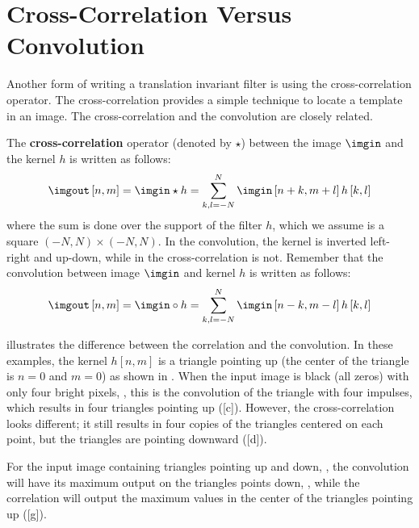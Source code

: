 \section{Cross-Correlation Versus Convolution}

Another form of writing a translation invariant filter is using the cross-correlation operator. The cross-correlation provides a simple technique to locate a template in an image.
The cross-correlation and the convolution are closely related.


The {\bf cross-correlation} operator (denoted by $\star$) between the image $\imgin$ and the kernel $h$ is written as follows:
\begin{equation}
	\imgout \left[n,m\right] = \imgin \star h =  \sum_{k,l=-N}^N \imgin \left[n+k,m+l \right] h \left[k,l \right]
\end{equation}
where the sum is done over the support of the filter $h$, which we assume is a square $(-N,N)\times(-N,N)$.
In the convolution, the kernel is inverted left-right and up-down, while in the cross-correlation is not. Remember that the convolution between image $\imgin$ and kernel $h$ is written as follows:
\begin{equation}
	\imgout \left[n,m\right] = \imgin \circ h = \sum_{k,l=-N}^N \imgin \left[n-k,m-l \right] h \left[k,l \right]
\end{equation}



\Fig{\ref{fig:corrvsconv}} illustrates the difference between the correlation and the convolution. In these examples, the kernel $h[n,m]$ is a triangle pointing up (the center of the triangle is $n=0$ and $m=0$) as shown in . When the input image is black (all zeros) with only four bright pixels, , this is the convolution of the triangle with four impulses, which results in four triangles pointing up (\fig{\ref{fig:corrvsconv}}[c]). However, the cross-correlation looks different; it still results in four copies of the triangles centered on each point, but the triangles are pointing downward (\fig{\ref{fig:corrvsconv}}[d]).

For the input image containing triangles pointing up and down, , the convolution will have its maximum output on the triangles points down, , while the correlation will output the maximum values in the center of the triangles pointing up (\fig{\ref{fig:corrvsconv}}[g]).



